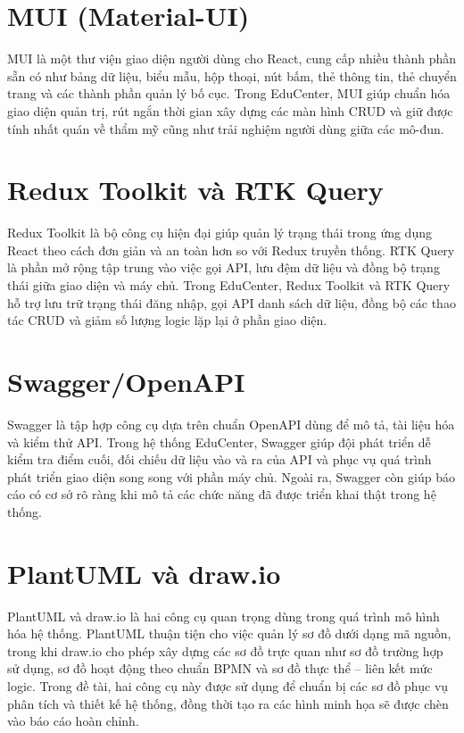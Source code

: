 \documentclass[../DoAn.tex]{subfiles}
\begin{document}
\section{MUI (Material-UI)}
\label{section:3.9}
MUI là một thư viện giao diện người dùng cho React, cung cấp nhiều thành phần sẵn có như bảng dữ liệu, biểu mẫu, hộp thoại, nút bấm, thẻ thông tin, thẻ chuyển trang và các thành phần quản lý bố cục. Trong EduCenter, MUI giúp chuẩn hóa giao diện quản trị, rút ngắn thời gian xây dựng các màn hình CRUD và giữ được tính nhất quán về thẩm mỹ cũng như trải nghiệm người dùng giữa các mô-đun.

\section{Redux Toolkit và RTK Query}
\label{section:3.10}
Redux Toolkit là bộ công cụ hiện đại giúp quản lý trạng thái trong ứng dụng React theo cách đơn giản và an toàn hơn so với Redux truyền thống. RTK Query là phần mở rộng tập trung vào việc gọi API, lưu đệm dữ liệu và đồng bộ trạng thái giữa giao diện và máy chủ. Trong EduCenter, Redux Toolkit và RTK Query hỗ trợ lưu trữ trạng thái đăng nhập, gọi API danh sách dữ liệu, đồng bộ các thao tác CRUD và giảm số lượng logic lặp lại ở phần giao diện.

\section{Swagger/OpenAPI}
\label{section:3.11}
Swagger là tập hợp công cụ dựa trên chuẩn OpenAPI dùng để mô tả, tài liệu hóa và kiểm thử API. Trong hệ thống EduCenter, Swagger giúp đội phát triển dễ kiểm tra điểm cuối, đối chiếu dữ liệu vào và ra của API và phục vụ quá trình phát triển giao diện song song với phần máy chủ. Ngoài ra, Swagger còn giúp báo cáo có cơ sở rõ ràng khi mô tả các chức năng đã được triển khai thật trong hệ thống.

\section{PlantUML và draw.io}
\label{section:3.12}
PlantUML và draw.io là hai công cụ quan trọng dùng trong quá trình mô hình hóa hệ thống. PlantUML thuận tiện cho việc quản lý sơ đồ dưới dạng mã nguồn, trong khi draw.io cho phép xây dựng các sơ đồ trực quan như sơ đồ trường hợp sử dụng, sơ đồ hoạt động theo chuẩn BPMN và sơ đồ thực thể -- liên kết mức logic. Trong đề tài, hai công cụ này được sử dụng để chuẩn bị các sơ đồ phục vụ phân tích và thiết kế hệ thống, đồng thời tạo ra các hình minh họa sẽ được chèn vào báo cáo hoàn chỉnh.
\end{document}
